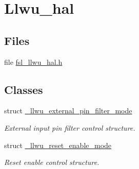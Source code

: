 \hypertarget{group__llwu__hal}{}\section{Llwu\+\_\+hal}
\label{group__llwu__hal}
\subsection*{Files}
\begin{DoxyCompactItemize}
\item 
file \hyperlink{fsl__llwu__hal_8h}{fsl\+\_\+llwu\+\_\+hal.\+h}
\end{DoxyCompactItemize}
\subsection*{Classes}
\begin{DoxyCompactItemize}
\item 
struct \hyperlink{struct__llwu__external__pin__filter__mode}{\+\_\+llwu\+\_\+external\+\_\+pin\+\_\+filter\+\_\+mode}
\begin{DoxyCompactList}\small\item\em External input pin filter control structure. \end{DoxyCompactList}\item 
struct \hyperlink{struct__llwu__reset__enable__mode}{\+\_\+llwu\+\_\+reset\+\_\+enable\+\_\+mode}
\begin{DoxyCompactList}\small\item\em Reset enable control structure. \end{DoxyCompactList}\end{DoxyCompactItemize}
